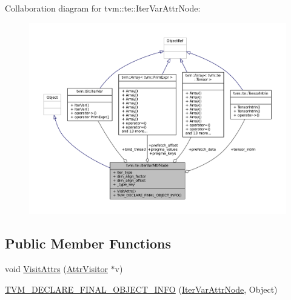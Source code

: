 Collaboration diagram for tvm\+:\+:te\+:\+:Iter\+Var\+Attr\+Node\+:
\nopagebreak
\begin{figure}[H]
\begin{center}
\leavevmode
\includegraphics[width=350pt]{classtvm_1_1te_1_1IterVarAttrNode__coll__graph}
\end{center}
\end{figure}
\subsection*{Public Member Functions}
\begin{DoxyCompactItemize}
\item 
void \hyperlink{classtvm_1_1te_1_1IterVarAttrNode_a70777d616a8dd11b2d449f4b7af9869e}{Visit\+Attrs} (\hyperlink{classtvm_1_1AttrVisitor}{Attr\+Visitor} $\ast$v)
\item 
\hyperlink{classtvm_1_1te_1_1IterVarAttrNode_a3446175a69783cc712430b3a4c9a897e}{T\+V\+M\+\_\+\+D\+E\+C\+L\+A\+R\+E\+\_\+\+F\+I\+N\+A\+L\+\_\+\+O\+B\+J\+E\+C\+T\+\_\+\+I\+N\+FO} (\hyperlink{classtvm_1_1te_1_1IterVarAttrNode}{Iter\+Var\+Attr\+Node}, Object)
\end{DoxyCompactItemize}
